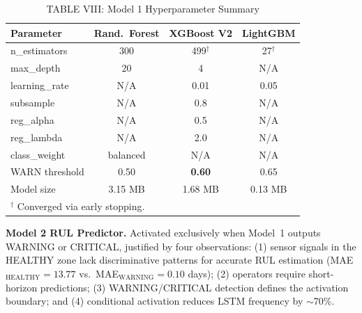 \documentclass[conference]{IEEEtran}
\begin{document}
\begin{table}[htbp]
\caption{TABLE VIII: Model 1 Hyperparameter Summary}
\centering
\begin{tabular}{p{2.2cm}ccc}
\hline
\textbf{Parameter} & \textbf{Rand.~Forest} & \textbf{XGBoost V2} & \textbf{LightGBM} \\
\hline
n\_estimators   & 300      & 499$^\dagger$ & 27$^\dagger$ \\
max\_depth      & 20       & 4             & N/A \\
learning\_rate  & N/A      & 0.01          & 0.05 \\
subsample       & N/A      & 0.8           & N/A \\
reg\_alpha      & N/A      & 0.5           & N/A \\
reg\_lambda     & N/A      & 2.0           & N/A \\
class\_weight   & balanced & N/A           & N/A \\
WARN threshold  & 0.50     & \textbf{0.60} & 0.65 \\
Model size      & 3.15 MB  & 1.68 MB       & 0.13 MB \\
\hline
\multicolumn{4}{l}{$^\dagger$ Converged via early stopping.} \\
\hline
\end{tabular}
\label{tab:hyper_clf}
\end{table}


\textbf{Model 2   RUL Predictor.}
Activated exclusively when Model~1 outputs WARNING or CRITICAL, justified by
four observations: (1) sensor signals in the HEALTHY zone lack discriminative
patterns for accurate RUL estimation (MAE$_\text{HEALTHY}=13.77$ vs.\
MAE$_\text{WARNING}=0.10$ days); (2) operators require short-horizon
predictions; (3) WARNING/CRITICAL detection defines the activation boundary;
and (4) conditional activation reduces LSTM frequency by $\sim$70\%.
\end{document}
